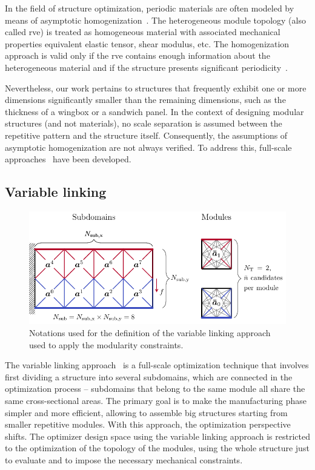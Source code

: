 In the field of structure optimization, periodic materials are often modeled by means of asymptotic homogenization~. The heterogeneous module topology (also called \gls{rve}) is treated as homogeneous material with associated mechanical properties \ie equivalent elastic tensor, shear modulus, etc. The homogenization approach is valid only if the \gls{rve} contains enough information about the heterogeneous material and if the structure presents significant periodicity~. 

Nevertheless, our work pertains to structures that frequently exhibit one or more dimensions significantly smaller than the remaining dimensions, such as the thickness of a wingbox or a sandwich panel. In the context of designing modular structures (and not materials), no scale separation is assumed between the repetitive pattern and the structure itself. Consequently, the assumptions of asymptotic homogenization are not always verified. To address this, full-scale approaches~ have been developed.

\subsection{Variable linking}
\begin{figure}
    \centering
    \includegraphics{figures/05_cellular_opt/00_modules_VL_bc/modules_bc.pdf}
    \caption{Notations used for the definition of the variable linking approach used to apply the modularity constraints.}
    \label{fig:05_VL}
\end{figure}

The variable linking approach~ is a full-scale optimization technique that involves first dividing a structure into several subdomains, which are connected in the optimization process -- \ie subdomains that belong to the same module all share the same cross-sectional areas. The primary goal is to make the manufacturing phase simpler and more efficient, allowing to assemble big structures starting from smaller repetitive modules. With this approach, the optimization perspective shifts. The optimizer design space using the variable linking approach is restricted to the optimization of the topology of the modules, using the whole structure just to evaluate and to impose the necessary mechanical constraints.

